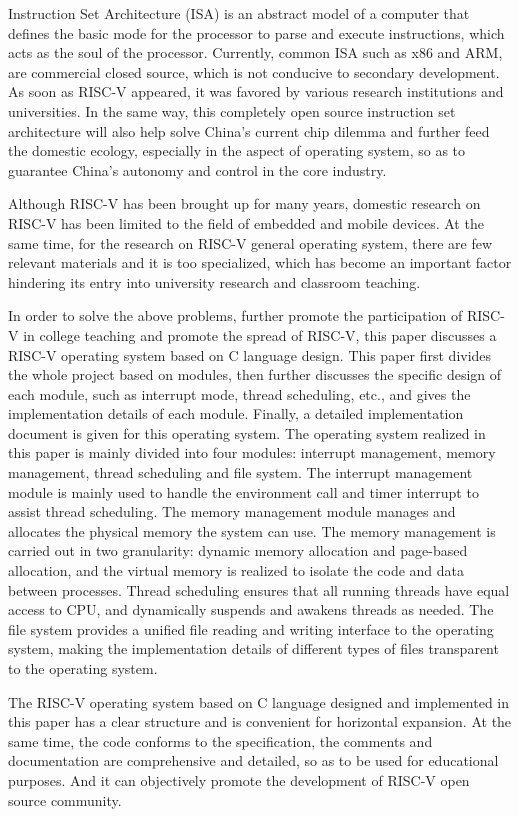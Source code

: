 \begin{eabstract}

 Instruction Set Architecture (ISA) is an abstract model of a computer that defines the basic mode for the processor to parse and execute instructions, which acts as the soul of the processor. Currently, common ISA such as x86 and ARM, are commercial closed source, which is not conducive to secondary development. As soon as RISC-V appeared, it was favored by various research institutions and universities. In the same way, this completely open source instruction set architecture will also help solve China's current chip dilemma and further feed the domestic ecology, especially in the aspect of operating system, so as to guarantee China's autonomy and control in the core industry.

Although RISC-V has been brought up for many years, domestic research on RISC-V has been limited to the field of embedded and mobile devices. At the same time, for the research on RISC-V general operating system, there are few relevant materials and it is too specialized, which has become an important factor hindering its entry into university research and classroom teaching.

In order to solve the above problems, further promote the participation of RISC-V in college teaching and promote the spread of RISC-V, this paper discusses a RISC-V operating system based on C language design. This paper first divides the whole project based on modules, then further discusses the specific design of each module, such as interrupt mode, thread scheduling, etc., and gives the implementation details of each module. Finally, a detailed implementation document is given for this operating system. The operating system realized in this paper is mainly divided into four modules: interrupt management, memory management, thread scheduling and file system. The interrupt management module is mainly used to handle the environment call and timer interrupt to assist thread scheduling. The memory management module manages and allocates the physical memory the system can use. The memory management is carried out in two granularity: dynamic memory allocation and page-based allocation, and the virtual memory is realized to isolate the code and data between processes. Thread scheduling ensures that all running threads have equal access to CPU, and dynamically suspends and awakens threads as needed. The file system provides a unified file reading and writing interface to the operating system, making the implementation details of different types of files transparent to the operating system.

The RISC-V operating system based on C language designed and implemented in this paper has a clear structure and is convenient for horizontal expansion. At the same time, the code conforms to the specification, the comments and documentation are comprehensive and detailed, so as to be used for educational purposes. And it can objectively promote the development of RISC-V open source community.

\end{eabstract}
